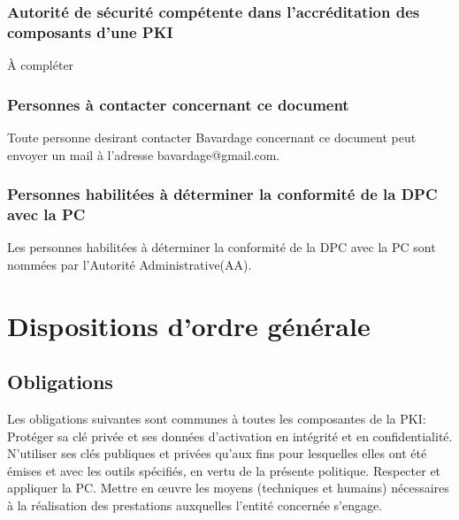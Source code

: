 \documentclass[a4paper,11pt,french]{book}
\begin{document}
\subsubsection{Autorité de sécurité compétente dans l'accréditation des composants d'une PKI}
		À compléter
		
\subsubsection{Personnes à contacter concernant ce document}		
Toute personne desirant contacter Bavardage concernant ce document peut envoyer un mail à l'adresse bavardage@gmail.com.

\subsubsection{Personnes habilitées à déterminer la conformité de la DPC avec la PC}

Les personnes habilitées à déterminer la conformité de la DPC avec la PC sont nommées par l’Autorité Administrative(AA).

\section{Dispositions d'ordre générale}
\subsection{Obligations}
Les obligations suivantes sont communes à toutes les composantes de la PKI:
Protéger sa clé privée et ses données d’activation en intégrité et en confidentialité.
N’utiliser ses clés publiques et privées qu’aux fins pour lesquelles elles ont été émises et avec les outils spécifiés, en vertu de la présente politique.
Respecter et appliquer la PC.
Mettre en œuvre les moyens (techniques et humains) nécessaires à la réalisation des prestations auxquelles l’entité concernée s’engage.
\end{document}
